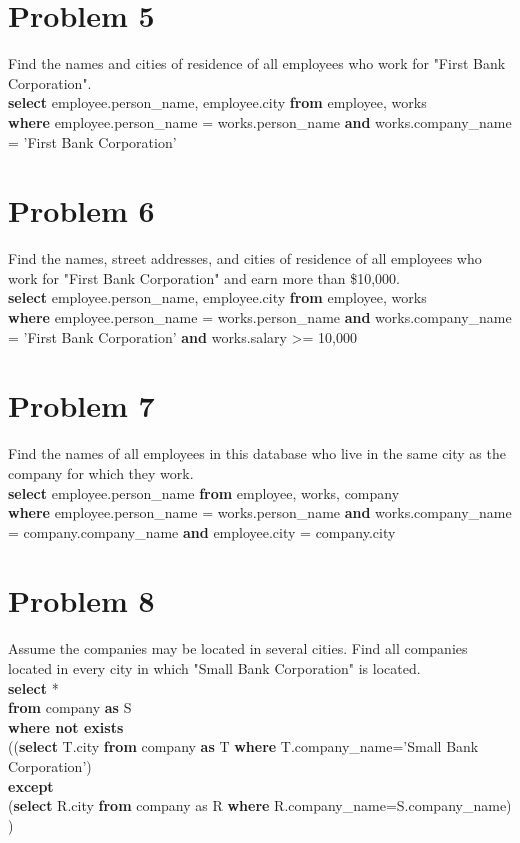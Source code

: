 \documentclass[paper=a4, fontsize=11pt]{scrartcl} %
\numberwithin{equation}{section} %
\numberwithin{figure}{section} %
\numberwithin{table}{section} %
\begin{document}
\section*{Problem 5}
Find the names and cities of residence of all employees who work for "First Bank Corporation".\\
\textbf{select} employee.person\_name, employee.city \textbf{from} employee, works \\
\textbf{where} employee.person\_name = works.person\_name \textbf{and}  works.company\_name = 'First Bank Corporation'
\section{Problem 6}
Find the names, street addresses, and cities of residence of all employees who work for "First Bank Corporation" and earn more than \$10,000.\\
\textbf{select} employee.person\_name, employee.city \textbf{from} employee, works \\
\textbf{where} employee.person\_name = works.person\_name \textbf{and}  works.company\_name = 'First Bank Corporation' \textbf{and} works.salary >= 10,000
\section{Problem 7}
Find the names of all employees in this database who live in the same city as the company for which they work.\\
\textbf{select} employee.person\_name \textbf{from} employee, works, company \\
\textbf{where} employee.person\_name = works.person\_name \textbf{and}  works.company\_name = company.company\_name \textbf{and} employee.city = company.city
\section{Problem 8}
Assume the companies may be located in several cities. Find all companies located in every city in which "Small Bank Corporation" is located.\\
\textbf{select} * \\
\textbf{from} company  \textbf{as} S\\
\textbf{where  not exists} \\
((\textbf{select} T.city \textbf{from} company  \textbf{as} T \textbf{where} T.company\_name='Small Bank Corporation')\\
\textbf{except}\\
(\textbf{select} R.city \textbf{from} company as R \textbf{where} R.company\_name=S.company\_name)
)
\end{document}
